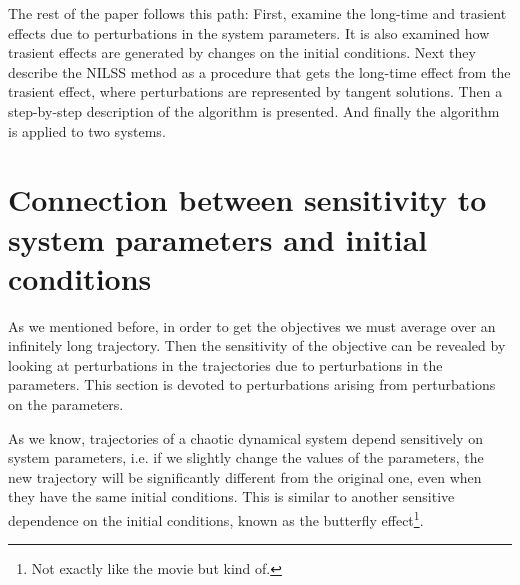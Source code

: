\documentclass[12pt,twoside,a4paper]{article} %
\begin{document}
The rest of the paper follows this path: First, examine the long-time and trasient effects due to perturbations in the system parameters. It is also examined how trasient effects are generated by changes on the initial conditions. Next they describe the NILSS method as a procedure that gets the long-time effect from the trasient effect, where perturbations are represented by tangent solutions. Then a step-by-step description of the algorithm is presented. And finally the algorithm is applied to two systems.

\section{Connection between sensitivity to system parameters and initial conditions}

As we mentioned before, in order to get the objectives we must average over an infinitely long trajectory. Then the sensitivity of the objective can be revealed by looking at perturbations in the trajectories due to perturbations in the parameters. This section is devoted to perturbations arising from perturbations on the parameters.

As we know, trajectories of a chaotic dynamical system depend sensitively on system parameters, i.e. if we slightly change the values of the parameters, the new trajectory will be significantly different from the original one, even when they have the same initial conditions. This is similar to another sensitive dependence on the initial conditions, known as the butterfly effect\footnote{Not exactly like the movie but kind of.}.
\end{document}
